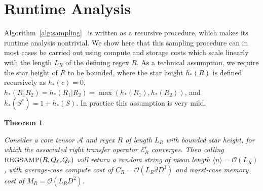 \documentclass[twoside]{article}
\newtheorem{theorem}{Theorem}
\newcommand{\Sample}{\textsc{\small REGSAMP}}
\newcommand{\bigO}{\mc{O}}
\newcommand{\ER}{\mc{E}^{\scriptstyle r}}
\newcommand{\QL}{Q_{\ell}}
\newcommand{\QR}{Q_{r}}
\newcommand{\mc}[1]{\mathcal{#1}}
\begin{document}
\section{Runtime Analysis}
\label{sec:appendix_c}

Algorithm~\ref{alg:sampling} 
\ is written as a recursive procedure, which makes its runtime analysis nontrivial. We show here that this sampling procedure can in most cases be carried out using compute and storage costs which scale linearly with the length $L_R$ of the defining regex $R$. As a technical assumption, we require the star height of $R$ to be bounded, where the star height $h_*(R)$ is defined recursively as $h_*(c) = 0$, $h_*(R_1 R_2) = h_*(R_1 | R_2) = \max(h_*(R_1), h_*(R_2))$, and $h_*(S^*) = 1 + h_*(S)$. In practice this assumption is very mild.

\begin{theorem}
\label{thm:runtime}

Consider a core tensor $\mc{A}$ and regex $R$ of length $L_R$ with bounded star height, for which the associated right transfer operator $\ER_R$ converges. Then calling $\Sample(R, \QL, \QR)$ will return a random string of mean length $\langle n \rangle = \bigO(L_R)$, with average-case compute cost of $C_R = \bigO(L_R d D^3)$ and worst-case memory cost of $M_R = \bigO(L_R D^2)$.

\end{theorem}
\end{document}
